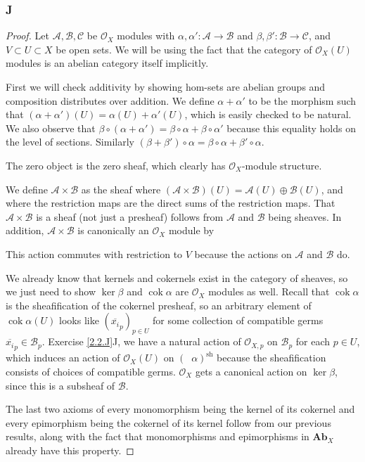 \documentclass{article}
\newcommand{\fA}{\mathscr{A}}
\newcommand{\fB}{\mathscr{B}}
\newcommand{\fC}{\mathscr{C}}
\newcommand{\fO}{\mathscr{O}}
\newcommand{\Ab}{\mathbf{Ab}} %
\DeclareMathOperator{\cok}{\mathrm{cok}}
\DeclareMathOperator{\cokpre}{\cok_{\text{pre}}}
\DeclareMathOperator{\sh}{sh}
\begin{document}
\subsubsection{J}\label{2.6.J}
\begin{proof}
     Let $\fA, \fB, \fC$ be $\fO_X$ modules with $\alpha, \alpha':\fA \to \fB$ and $\beta,\beta': \fB \to \fC$, and $V\subset U\subset X$ be open sets. We will be using the fact that the category of $\fO_X(U)$ modules is an abelian category itself implicitly.
     
     First we will check additivity by showing hom-sets are abelian groups and composition distributes over addition. We define $\alpha+\alpha'$ to be the morphism such that $(\alpha+\alpha')(U)=\alpha(U)+\alpha'(U)$, which is easily checked to be natural. We also observe that $\beta \circ (\alpha+\alpha')=\beta \circ \alpha + \beta \circ \alpha'$ because this equality holds on the level of sections. Similarly $(\beta+\beta')\circ \alpha = \beta \circ \alpha + \beta' \circ \alpha$.

     The zero object is the zero sheaf, which clearly has $\fO_X$-module structure.

     We define $\fA \times \fB$ as the sheaf where $(\fA\times \fB)(U)=\fA(U)\oplus \fB(U)$, and where the restriction maps are the direct sums of the restriction maps. That $\fA \times \fB$ is a sheaf (not just a presheaf) follows from $\fA$ and $\fB$ being sheaves. In addition, $\fA\times \fB$ is canonically an $\fO_X$ module by
     \begin{center}
     \end{center}
     This action commutes with restriction to $V$ because the actions on $\fA$ and $\fB$ do.

     We already know that kernels and cokernels exist in the category of sheaves, so we just need to show $\ker \beta$ and $\cok \alpha$ are $\fO_X$ modules as well. Recall that $\cok \alpha$ is the sheafification of the cokernel presheaf, so an arbitrary element of $\cok \alpha(U)$ looks like $(\overline{x_i}_p)_{p\in U}$ for some collection of compatible germs $\overline{x_i}_p\in \fB_p$. Exercise \ref{2.2.J}J, we have a natural action of $\fO_{X,p}$ on $\fB_p$ for each $p\in U$, which induces an action of $\fO_X(U)$ on $(\cokpre \alpha)^{\sh}$ because the sheafification consists of choices of compatible germs. $\fO_X$ gets a canonical action on $\ker \beta$, since this is a subsheaf of $\fB$.

     The last two axioms of every monomorphism being the kernel of its cokernel and every epimorphism being the cokernel of its kernel follow from our previous results, along with the fact that monomorphisms and epimorphisms in $\Ab_X$ already have this property.
\end{proof}
\end{document}
